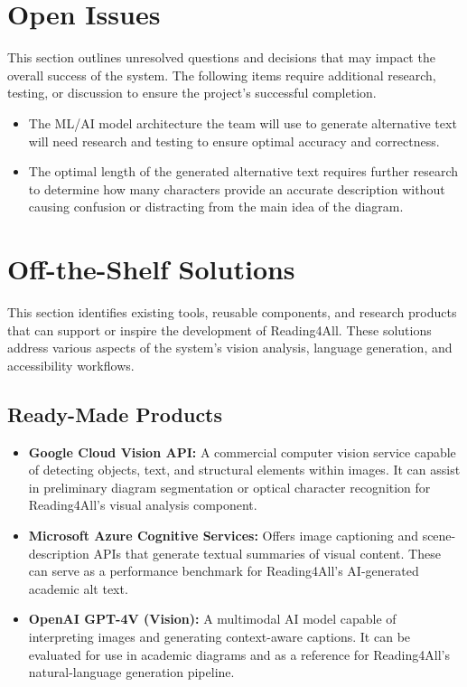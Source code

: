 \documentclass[12pt]{article}
\begin{document}
\section{Open Issues}
This section outlines unresolved questions and decisions that may impact the overall success of the system.
The following items require additional research, testing, or discussion to ensure the project’s successful completion. 
\begin{itemize}
  \item The ML/AI model architecture the team will use to generate alternative text will need research and testing 
  to ensure optimal accuracy and correctness.
  \item The optimal length of the generated alternative text requires further research to determine how many characters provide an 
  accurate description without causing confusion or distracting from the main idea of the diagram.
\end{itemize}

\section{Off-the-Shelf Solutions}

This section identifies existing tools, reusable components, and research products that can support or inspire the development of Reading4All. These solutions address various aspects of the system’s vision analysis, language generation, and accessibility workflows.

\subsection{Ready-Made Products}

\begin{itemize}
    \item \textbf{Google Cloud Vision API:} A commercial computer vision service capable of detecting objects, text, and structural elements within images. It can assist in preliminary diagram segmentation or optical character recognition for Reading4All’s visual analysis component.

    \item \textbf{Microsoft Azure Cognitive Services:} Offers image captioning and scene-description APIs that generate textual summaries of visual content. These can serve as a performance benchmark for Reading4All’s AI-generated academic alt text.

    \item \textbf{OpenAI GPT-4V (Vision):} A multimodal AI model capable of interpreting images and generating context-aware captions. It can be evaluated for use in academic diagrams and as a reference for Reading4All’s natural-language generation pipeline.
\end{itemize}
\end{document}
